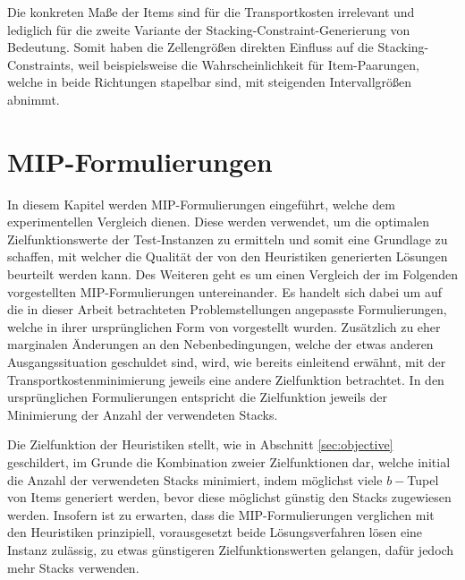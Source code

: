  Die konkreten Maße der Items sind für die Transportkosten irrelevant und lediglich
für die zweite Variante der Stacking-Constraint-Generierung von Bedeutung.
Somit haben die Zellengrößen direkten Einfluss auf die Stacking-Constraints,
weil beispielsweise die Wahrscheinlichkeit für Item-Paarungen, welche in beide Richtungen stapelbar sind,
mit steigenden Intervallgrößen abnimmt.

\vfill

\pagebreak

\section{MIP-Formulierungen}
\label{sec:mip_formulations}

In diesem Kapitel werden MIP-Formulierungen eingeführt, welche dem experimentellen Vergleich dienen.
Diese werden verwendet, um die optimalen Zielfunktionswerte der Test-Instanzen zu ermitteln und somit eine Grundlage zu schaffen, mit welcher die Qualität der von den Heuristiken generierten Lösungen beurteilt werden kann. Des Weiteren geht es um einen Vergleich der im Folgenden vorgestellten MIP-Formulierungen untereinander.
Es handelt sich dabei um auf die in dieser Arbeit betrachteten Problemstellungen angepasste Formulierungen,
welche in ihrer ursprünglichen Form von \citet{Le2016} vorgestellt wurden.
Zusätzlich zu eher marginalen Änderungen an den Nebenbedingungen, welche der etwas anderen Ausgangssituation geschuldet sind,
wird, wie bereits einleitend erwähnt, mit der Transportkostenminimierung jeweils eine andere Zielfunktion betrachtet.
In den ursprünglichen Formulierungen entspricht die Zielfunktion jeweils der Minimierung der Anzahl der verwendeten Stacks.

Die Zielfunktion der Heuristiken stellt, wie in Abschnitt \ref{sec:objective} geschildert, im Grunde die Kombination
zweier Zielfunktionen dar, welche initial die Anzahl der verwendeten Stacks minimiert, indem möglichst viele
$b-$Tupel von Items generiert werden, bevor diese möglichst günstig den Stacks zugewiesen werden.
Insofern ist zu erwarten, dass die MIP-Formulierungen verglichen mit den Heuristiken prinzipiell,
vorausgesetzt beide Lösungsverfahren lösen eine Instanz zulässig, zu etwas günstigeren Zielfunktionswerten gelangen,
dafür jedoch mehr Stacks verwenden.

